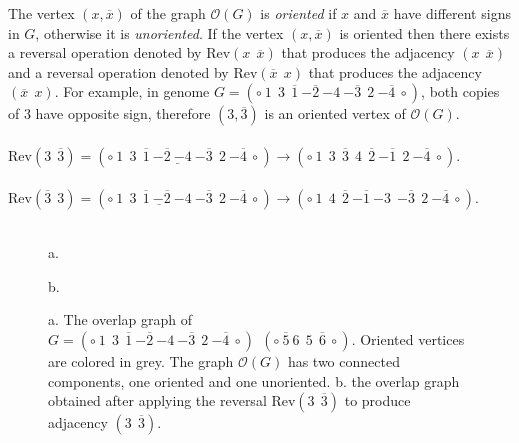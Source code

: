 \documentclass[11pt,final,twoside,nofrench]{thlifl}
\newcommand{\fst}[1]{ \ensuremath{#1} }
\newcommand{\snd}[1]{ \ensuremath{\overline{#1}} }
\newcommand{\msnd}[1]{ \ensuremath{{-\overline{#1}}} }
\begin{document}
The vertex $(x,\snd{x})$ of the graph $\mathcal{O}(G)$ is \emph{oriented} 
if $x$ and $\snd{x}$ have different signs in $G$, 
otherwise it is \emph{unoriented}. If the vertex $(x,\snd{x})$ is 
oriented then there exists a reversal operation denoted by 
$\text{Rev}(x~~\snd{x})$ 
that produces the adjacency $(x~~\snd{x})$ and a reversal operation 
denoted by $\text{Rev}(\snd{x}~~x)$ that produces the adjacency 
$(\snd{x}~~x)$. 
For example, in genome  $G=(\circ ~ 1~~3~~\snd{1}~\msnd{2}~{-4}~ \msnd{3}~~2~\msnd{4}~ {\circ})$, both copies of 3 have opposite sign, therefore $(3,\snd{3})$ is an oriented vertex of $\mathcal{O}(G)$.\\
\\
$\text{Rev}(3~~\snd{3}) = (\circ ~ 1~~3~\underline{~\snd{1}~\msnd{2}~{-4}~ \msnd{3}~}~2~\msnd{4}~ {\circ})  \rightarrow (\circ ~ 1~~3~~\snd{3}~~4~~\snd{2}~\msnd{1}~~2~\msnd{4}~ {\circ})$.\\
\\
$\text{Rev}(\snd{3}~~3) = (\circ ~ 1~\underline{~3~~\snd{1}~\msnd{2}~{-4}}~ \msnd{3}~~2~\msnd{4}~ {\circ})  \rightarrow (\circ ~ 1~~4~~\snd{2}~\msnd{1}~{-3}~~\msnd{3}~~2~\msnd{4}~ {\circ})$.\\
\\

\begin{figure}[h!]
    \centering
 a.   
b.

\caption{a. The overlap graph of $G=(\circ ~ 1~~3~~\snd{1}~\msnd{2}~{-4}~ \msnd{3}~~2~\msnd{4}~ {\circ})~~ (\circ ~\snd{5}~6~~5~~\snd{6}~ {\circ})$. Oriented vertices are colored in grey. The graph
$\mathcal{O}(G)$ has two connected components, one oriented and one unoriented. 
b. the overlap graph obtained after applying the reversal $\text{Rev}(3~~\snd{3})$ to produce adjacency $(3~~\snd{3})$.}
\label{fig:overlap}
\end{figure}
\end{document}
